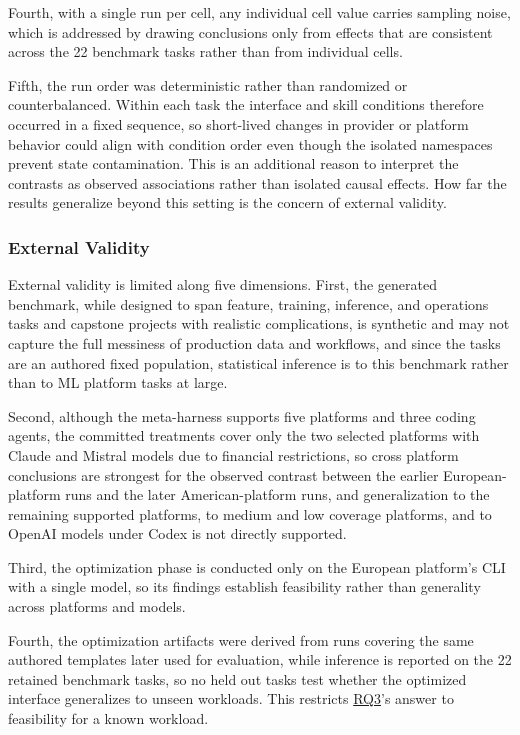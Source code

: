 \documentclass[
english,                 %
bibtex,                  %
]{kththesis}
\numberwithin{listing}{chapter}
\begin{document}
Fourth, with a single run per cell, any individual cell value carries sampling noise, which is addressed by drawing conclusions only from effects that are consistent across the 22 benchmark tasks rather than from individual cells.

Fifth, the run order was deterministic rather than randomized or counterbalanced. Within each task the interface and skill conditions therefore occurred in a fixed sequence, so short-lived changes in provider or platform behavior could align with condition order even though the isolated namespaces prevent state contamination. This is an additional reason to interpret the contrasts as observed associations rather than isolated causal effects. How far the results generalize beyond this setting is the concern of external validity.

\subsubsection{External Validity}
\label{sec:method_external_validity}

External validity is limited along five dimensions. First, the generated benchmark, while designed to span feature, training, inference, and operations tasks and capstone projects with realistic complications, is synthetic and may not capture the full messiness of production data and workflows, and since the tasks are an authored fixed population, statistical inference is to this benchmark rather than to \gls{ML} platform tasks at large.

Second, although the meta-harness supports five platforms and three coding agents, the committed treatments cover only the two selected platforms with Claude and Mistral models due to financial restrictions, so cross platform conclusions are strongest for the observed contrast between the earlier European-platform runs and the later American-platform runs, and generalization to the remaining supported platforms, to medium and low coverage platforms, and to \gls{OpenAI} models under Codex is not directly supported.

Third, the optimization phase is conducted only on the European platform's \gls{CLI} with a single model, so its findings establish feasibility rather than generality across platforms and models.

Fourth, the optimization artifacts were derived from runs covering the same authored templates later used for evaluation, while inference is reported on the 22 retained benchmark tasks, so no held out tasks test whether the optimized interface generalizes to unseen workloads. This restricts \hyperref[rq3]{RQ3}'s answer to feasibility for a known workload.
\end{document}
